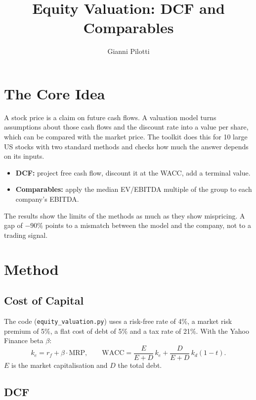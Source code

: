 \documentclass[11pt,a4paper]{article}
\title{Equity Valuation: DCF and Comparables}
\author{Gianni Pilotti}
\date{}
\begin{document}
\maketitle

\section{The Core Idea}

A stock price is a claim on future cash flows. A valuation model turns assumptions about those cash flows and the discount rate into a value per share, which can be compared with the market price. The toolkit does this for 10 large US stocks with two standard methods and checks how much the answer depends on its inputs.

\begin{itemize}
\item \textbf{DCF:} project free cash flow, discount it at the WACC, add a terminal value.
\item \textbf{Comparables:} apply the median EV/EBITDA multiple of the group to each company's EBITDA.
\end{itemize}

The results show the limits of the methods as much as they show mispricing. A gap of $-90\%$ points to a mismatch between the model and the company, not to a trading signal.

\section{Method}

\subsection{Cost of Capital}

The code (\texttt{equity\_valuation.py}) uses a risk-free rate of 4\%, a market risk premium of 5\%, a flat cost of debt of 5\% and a tax rate of 21\%. With the Yahoo Finance beta $\beta$:
\begin{equation}
k_e=r_f+\beta\cdot\text{MRP},\qquad
\text{WACC}=\frac{E}{E+D}\,k_e+\frac{D}{E+D}\,k_d(1-t).
\end{equation}
$E$ is the market capitalisation and $D$ the total debt.

\subsection{DCF}
\end{document}
